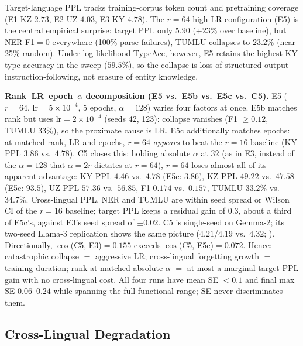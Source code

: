 \documentclass[11pt]{article}
\begin{document}
Target-language PPL tracks training-corpus token count and pretraining coverage (E1 KZ $2.73$, E2 UZ $4.03$, E3 KY $4.78$). The $r{=}64$ high-LR configuration (E5) is the central empirical surprise: target PPL only $5.90$ ($+23\%$ over baseline), but NER F1$=0$ everywhere (100\% parse failures), TUMLU collapses to $23.2\%$ (near 25\% random). Under log-likelihood TypeAcc, however, E5 retains the highest KY type accuracy in the sweep ($59.5\%$), so the collapse is loss of structured-output instruction-following, not erasure of entity knowledge.

\label{sec:spectral-collapse-rank-lr}
\textbf{Rank--LR--epoch--$\alpha$ decomposition (E5 vs.\ E5b vs.\ E5c vs.\ C5).} E5 ($r{=}64$, $\text{lr}{=}5{\times}10^{-4}$, 5 epochs, $\alpha{=}128$) varies four factors at once. E5b matches rank but uses $\text{lr}{=}2{\times}10^{-4}$ (seeds 42, 123): collapse vanishes (F1 $\geq 0.12$, TUMLU $33\%$), so the proximate cause is LR. E5c additionally matches epochs: at matched rank, LR and epochs, $r{=}64$ \emph{appears} to beat the $r{=}16$ baseline (KY PPL $3.86$ vs.\ $4.78$). C5 closes this: holding absolute $\alpha$ at $32$ (as in E3, instead of the $\alpha{=}128$ that $\alpha{=}2r$ dictates at $r{=}64$), $r{=}64$ loses almost all of its apparent advantage: KY PPL $4.46$ vs.\ $4.78$ (E5c: $3.86$), KZ PPL $49.22$ vs.\ $47.58$ (E5c: $93.5$), UZ PPL $57.36$ vs.\ $56.85$, F1 $0.174$ vs.\ $0.157$, TUMLU $33.2\%$ vs.\ $34.7\%$. Cross-lingual PPL, NER and TUMLU are within seed spread or Wilson CI of the $r{=}16$ baseline; target PPL keeps a residual gain of $0.3$, about a third of E5c's, against E3's seed spread of $\pm0.02$. C5 is single-seed on Gemma-2; its two-seed Llama-3 replication shows the same picture ($4.21$/$4.19$ vs.\ $4.32$; ). Directionally, $\cos$(C5, E3)$=0.155$ exceeds $\cos$(C5, E5c)$=0.072$. Hence: catastrophic collapse $=$ aggressive LR; cross-lingual forgetting growth $=$ training duration; rank at matched absolute $\alpha$ $=$ at most a marginal target-PPL gain with no cross-lingual cost. All four runs have mean SE $< 0.1$ and final max SE $0.06$--$0.24$ while spanning the full functional range; SE never discriminates them.

\subsection{Cross-Lingual Degradation}
\label{sec:crosslingual}
\end{document}

